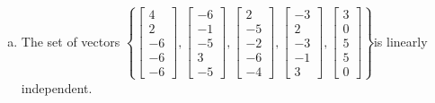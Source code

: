 \begin{exerciseAnswer}
\begin{enumerate}[(a)]
\item  The set of vectors \( \left\{ \left[\begin{array}{c}
4 \\
2 \\
-6 \\
-6 \\
-6
\end{array}\right] , \left[\begin{array}{c}
-6 \\
-1 \\
-5 \\
3 \\
-5
\end{array}\right] , \left[\begin{array}{c}
2 \\
-5 \\
-2 \\
-6 \\
-4
\end{array}\right] , \left[\begin{array}{c}
-3 \\
2 \\
-3 \\
-1 \\
3
\end{array}\right] , \left[\begin{array}{c}
3 \\
0 \\
5 \\
5 \\
0
\end{array}\right] \right\} \)is linearly independent.
\end{enumerate}
    
\end{exerciseAnswer}
    

